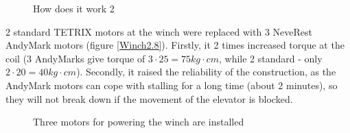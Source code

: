 \begin{figure}[H]
\begin{minipage}[h]{0.31\linewidth}
		\caption{How does it work 2}
		\label{Alpinists2.3}
	\end{minipage}
\end{figure}

2 standard TETRIX motors at the winch were replaced with 3 NeveRest AndyMark motors (figure \ref{Winch2.8}). Firstly, it 2 times increased torque at the coil (3 AndyMarks give torque of $3 \cdot 25 = 75 kg \cdot cm$, while 2 standard - only $2 \cdot 20 = 40 kg \cdot cm$). Secondly, it raised the reliability of the construction, as the AndyMark motors can cope with stalling for a long time (about 2 minutes), so they will not break down if the movement of the elevator is blocked.

\begin{figure}[H]
	\begin{minipage}[h]{1\linewidth}
		\caption{Three motors for powering the winch are installed}
		\label{Winch2.9}
	\end{minipage}
\end{figure}


